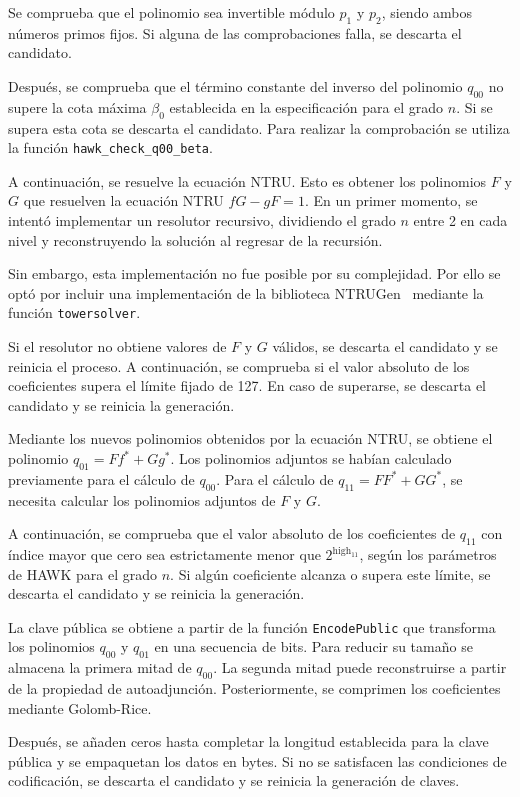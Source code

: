 Se comprueba que el polinomio sea invertible
módulo $p_1$ y $p_2$, siendo ambos números primos fijos.
Si alguna de las comprobaciones falla, se descarta el candidato.

Después, se comprueba que el término constante del inverso del polinomio
$q_{00}$ no supere la cota máxima $\beta_0$ establecida en
la especificación para el grado $n$. Si se supera
esta cota se descarta el candidato. Para realizar la comprobación
se utiliza la función \texttt{hawk\_check\_q00\_beta}.

A continuación, se resuelve la ecuación NTRU. Esto es obtener los
polinomios $F$ y $G$ que resuelven la ecuación NTRU $fG-gF=1$.
En un primer momento, se intentó implementar un resolutor recursivo, 
dividiendo el grado $n$ entre 2 en cada nivel 
y reconstruyendo la solución al regresar de la recursión.

Sin embargo, esta implementación no fue posible por su complejidad.
Por ello se optó por incluir una implementación de la biblioteca NTRUGen~\cite{ntrugen}
mediante la función \texttt{towersolver}.

Si el resolutor no obtiene valores de $F$ y $G$ válidos,
se descarta el candidato y se reinicia el proceso. 
A continuación, se comprueba si el valor absoluto de los coeficientes
supera el límite fijado de 127. En caso de superarse, se descarta el candidato
y se reinicia la generación.

Mediante los nuevos polinomios obtenidos por la ecuación NTRU,
se obtiene el polinomio $q_{01} = F f^{*} + G g^{*}$. Los polinomios
adjuntos se habían calculado previamente para el cálculo de $q_{00}$.
Para el cálculo de $q_{11} = F F^{*} + G G^{*}$, se necesita calcular
los polinomios adjuntos de $F$ y $G$.

A continuación, se comprueba que el valor absoluto de los
coeficientes de $q_{11}$ con índice mayor que cero sea
estrictamente menor que $2^{\mathrm{high}_{11}}$, según
los parámetros de HAWK para el grado $n$. 
Si algún coeficiente alcanza o supera este límite, 
se descarta el candidato y se reinicia la generación.

La clave pública se obtiene a partir de la función
\texttt{EncodePublic} que transforma los polinomios $q_{00}$ y $q_{01}$
en una secuencia de bits. Para reducir su tamaño se almacena la primera mitad de $q_{00}$.
La segunda mitad puede reconstruirse a partir de la propiedad de autoadjunción.
Posteriormente, se comprimen los coeficientes mediante Golomb-Rice. 

Después, se añaden ceros hasta completar la longitud establecida para la clave pública 
y se empaquetan los datos en bytes. Si no se satisfacen las condiciones
de codificación, se descarta el candidato y se reinicia la generación de claves.

